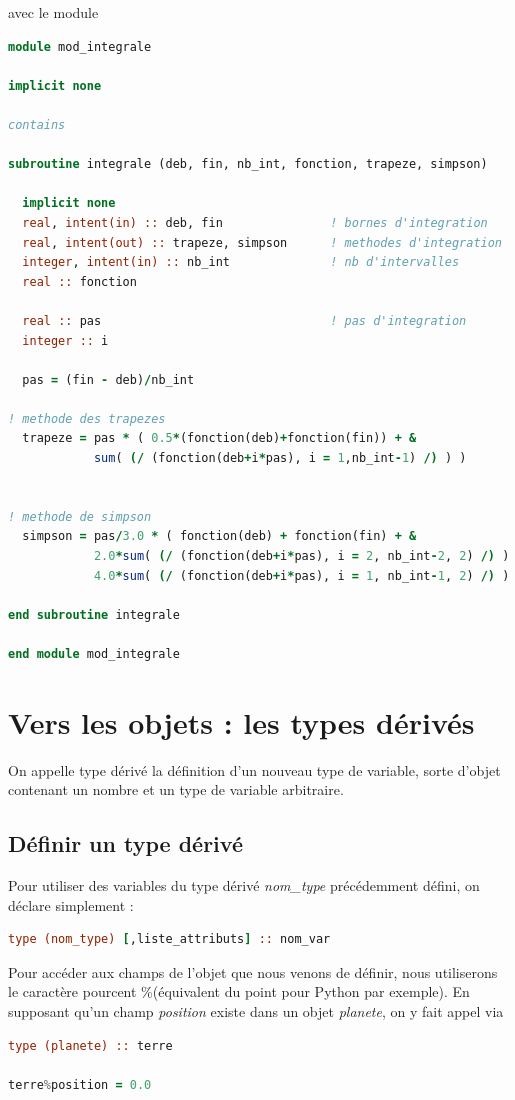 \documentclass[a4paper,twoside]{article}
\begin{document}
avec le module
\begin{lstlisting}[language=Fortran]
module mod_integrale

implicit none

contains

subroutine integrale (deb, fin, nb_int, fonction, trapeze, simpson)

  implicit none
  real, intent(in) :: deb, fin               ! bornes d'integration
  real, intent(out) :: trapeze, simpson      ! methodes d'integration
  integer, intent(in) :: nb_int              ! nb d'intervalles    
  real :: fonction

  real :: pas                                ! pas d'integration
  integer :: i

  pas = (fin - deb)/nb_int

! methode des trapezes
  trapeze = pas * ( 0.5*(fonction(deb)+fonction(fin)) + &
            sum( (/ (fonction(deb+i*pas), i = 1,nb_int-1) /) ) ) 


! methode de simpson
  simpson = pas/3.0 * ( fonction(deb) + fonction(fin) + &
            2.0*sum( (/ (fonction(deb+i*pas), i = 2, nb_int-2, 2) /) ) + &
            4.0*sum( (/ (fonction(deb+i*pas), i = 1, nb_int-1, 2) /) ) )

end subroutine integrale

end module mod_integrale
\end{lstlisting}


\section{Vers les objets : les types dérivés}
On appelle type dérivé la définition d'un nouveau type de variable, sorte d'objet contenant un nombre et un type de variable arbitraire. 

\subsection{Définir un type dérivé}

Pour utiliser des variables du type dérivé \textit{nom\_type} précédemment défini, on déclare simplement :
\begin{lstlisting}[language=Fortran]
type (nom_type) [,liste_attributs] :: nom_var
\end{lstlisting}

\begin{remarque}
Pour accéder aux champs de l'objet que nous venons de définir, nous utiliserons le caractère pourcent \og \%\fg (équivalent du point pour Python par exemple). En supposant qu'un champ \textit{position} existe dans un objet \textit{planete}, on y fait appel via
\begin{lstlisting}[language=Fortran]
type (planete) :: terre

terre%position = 0.0
\end{lstlisting}
\end{remarque}
\end{document}
